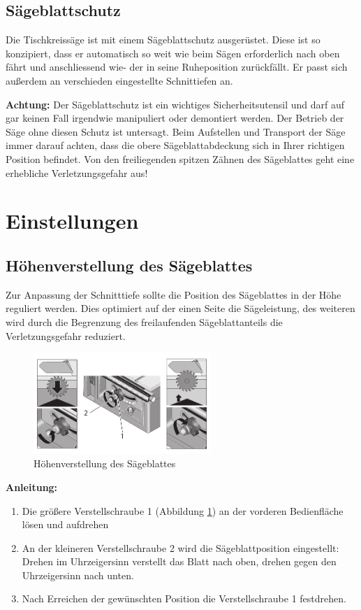 \documentclass{\basedir/fablab-document}
\begin{document}
\subsection{Sägeblattschutz}

Die Tischkreissäge ist mit einem Sägeblattschutz ausgerüstet. Diese ist so konzipiert, dass er automatisch so weit wie beim Sägen erforderlich nach oben fährt und anschliessend wie-
der in seine Ruheposition zurückfällt. Er passt sich außerdem an verschieden eingestellte Schnittiefen an.

\textbf{Achtung:} 
Der Sägeblattschutz ist ein wichtiges Sicherheitsutensil und darf auf gar keinen Fall irgendwie manipuliert oder demontiert werden. Der Betrieb der Säge ohne diesen Schutz ist untersagt.
Beim Aufstellen und Transport der Säge immer darauf achten, dass die obere Sägeblattabdeckung sich in Ihrer richtigen Position befindet. Von den freiliegenden spitzen Zähnen des Sägeblattes geht eine erhebliche Verletzungsgefahr aus!


\section{Einstellungen}
\subsection{Höhenverstellung des Sägeblattes}

Zur Anpassung der Schnitttiefe sollte die Position des Sägeblattes in der Höhe reguliert werden. Dies optimiert auf der einen Seite die Sägeleistung, des weiteren wird durch die Begrenzung des freilaufenden Sägeblattanteils die Verletzungsgefahr reduziert.

\begin{figure} 
	\centering
	\includegraphics[width=0.6\textwidth]{bilder/saegeverstellung.pdf}
	\caption{Höhenverstellung des Sägeblattes}
	\label{fig:verstellung}
\end{figure}


\textbf{Anleitung:} \\
\renewcommand{\labelenumi}{\alph{enumi})}
\begin{enumerate}
	\item Die größere Verstellschraube 1 (Abbildung \ref{fig:verstellung}) an der vorderen Bedienfläche lösen und aufdrehen
	\item An der kleineren Verstellschraube 2 wird die Sägeblattposition eingestellt: Drehen im Uhrzeigersinn verstellt das Blatt nach oben, drehen gegen den Uhrzeigersinn nach unten.
	\item Nach Erreichen der gewünschten Position die Verstellschraube 1 festdrehen.
\end{enumerate}
\end{document}
